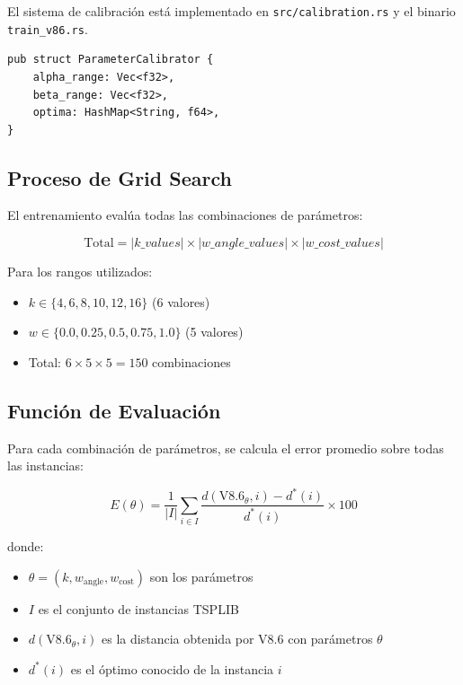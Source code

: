 \documentclass[12pt, a4paper]{article}
\begin{document}
El sistema de calibración está implementado en \texttt{src/calibration.rs} y el binario \texttt{train\_v86.rs}.

\begin{lstlisting}[style=rust, caption=Estructura del calibrador]
pub struct ParameterCalibrator {
    alpha_range: Vec<f32>,
    beta_range: Vec<f32>,
    optima: HashMap<String, f64>,
}
\end{lstlisting}

\subsection{Proceso de Grid Search}

El entrenamiento evalúa todas las combinaciones de parámetros:

\begin{equation}
\text{Total} = |k\_values| \times |w\_angle\_values| \times |w\_cost\_values|
\end{equation}

Para los rangos utilizados:
\begin{itemize}
    \item $k \in \{4, 6, 8, 10, 12, 16\}$ (6 valores)
    \item $w \in \{0.0, 0.25, 0.5, 0.75, 1.0\}$ (5 valores)
    \item Total: $6 \times 5 \times 5 = 150$ combinaciones
\end{itemize}

\subsection{Función de Evaluación}

Para cada combinación de parámetros, se calcula el error promedio sobre todas las instancias:

\begin{equation}
E(\theta) = \frac{1}{|I|} \sum_{i \in I} \frac{d(\text{V8.6}_\theta, i) - d^*(i)}{d^*(i)} \times 100
\end{equation}

donde:
\begin{itemize}
    \item $\theta = (k, w_{\text{angle}}, w_{\text{cost}})$ son los parámetros
    \item $I$ es el conjunto de instancias TSPLIB
    \item $d(\text{V8.6}_\theta, i)$ es la distancia obtenida por V8.6 con parámetros $\theta$
    \item $d^*(i)$ es el óptimo conocido de la instancia $i$
\end{itemize}
\end{document}

